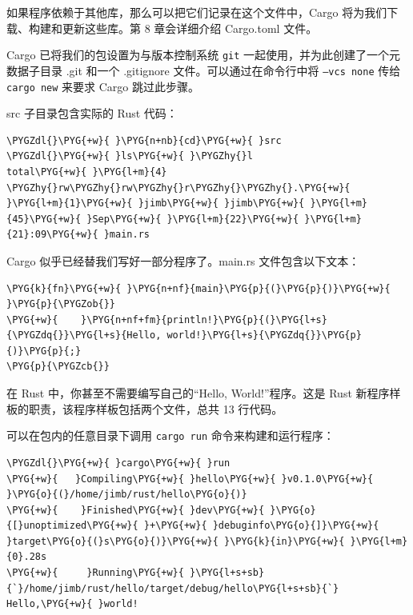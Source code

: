 如果程序依赖于其他库，那么可以把它们记录在这个文件中，Cargo 将为我们下载、构建和更新这些库。第 8 章会详细介绍 Cargo.toml 文件。

Cargo 已将我们的包设置为与版本控制系统 \texttt{git} 一起使用，并为此创建了一个元数据子目录 .git 和一个 .gitignore 文件。可以通过在命令行中将 \texttt{--vcs none} 传给 \texttt{cargo new} 来要求 Cargo 跳过此步骤。

src 子目录包含实际的 Rust 代码：

\begin{Verbatim}[commandchars=\\\{\},breaklines=true,breakanywhere=true,fontsize=\codefont,xleftmargin=17bp]
\PYGZdl{}\PYG{+w}{ }\PYG{n+nb}{cd}\PYG{+w}{ }src
\PYGZdl{}\PYG{+w}{ }ls\PYG{+w}{ }\PYGZhy{}l
total\PYG{+w}{ }\PYG{l+m}{4}
\PYGZhy{}rw\PYGZhy{}rw\PYGZhy{}r\PYGZhy{}\PYGZhy{}.\PYG{+w}{ }\PYG{l+m}{1}\PYG{+w}{ }jimb\PYG{+w}{ }jimb\PYG{+w}{ }\PYG{l+m}{45}\PYG{+w}{ }Sep\PYG{+w}{ }\PYG{l+m}{22}\PYG{+w}{ }\PYG{l+m}{21}:09\PYG{+w}{ }main.rs
\end{Verbatim}

Cargo 似乎已经替我们写好一部分程序了。main.rs 文件包含以下文本：

\begin{Verbatim}[commandchars=\\\{\},breaklines=true,breakanywhere=true,fontsize=\codefont,xleftmargin=17bp]
\PYG{k}{fn}\PYG{+w}{ }\PYG{n+nf}{main}\PYG{p}{(}\PYG{p}{)}\PYG{+w}{ }\PYG{p}{\PYGZob{}}
\PYG{+w}{    }\PYG{n+nf+fm}{println!}\PYG{p}{(}\PYG{l+s}{\PYGZdq{}}\PYG{l+s}{Hello, world!}\PYG{l+s}{\PYGZdq{}}\PYG{p}{)}\PYG{p}{;}
\PYG{p}{\PYGZcb{}}
\end{Verbatim}

在 Rust 中，你甚至不需要编写自己的“Hello, World!”程序。这是 Rust 新程序样板的职责，该程序样板包括两个文件，总共 13 行代码。

可以在包内的任意目录下调用 \texttt{cargo run} 命令来构建和运行程序：

\begin{Verbatim}[commandchars=\\\{\},breaklines=true,breakanywhere=true,fontsize=\codefont,xleftmargin=17bp]
\PYGZdl{}\PYG{+w}{ }cargo\PYG{+w}{ }run
\PYG{+w}{   }Compiling\PYG{+w}{ }hello\PYG{+w}{ }v0.1.0\PYG{+w}{ }\PYG{o}{(}/home/jimb/rust/hello\PYG{o}{)}
\PYG{+w}{    }Finished\PYG{+w}{ }dev\PYG{+w}{ }\PYG{o}{[}unoptimized\PYG{+w}{ }+\PYG{+w}{ }debuginfo\PYG{o}{]}\PYG{+w}{ }target\PYG{o}{(}s\PYG{o}{)}\PYG{+w}{ }\PYG{k}{in}\PYG{+w}{ }\PYG{l+m}{0}.28s
\PYG{+w}{     }Running\PYG{+w}{ }\PYG{l+s+sb}{`}/home/jimb/rust/hello/target/debug/hello\PYG{l+s+sb}{`}
Hello,\PYG{+w}{ }world!
\end{Verbatim}

